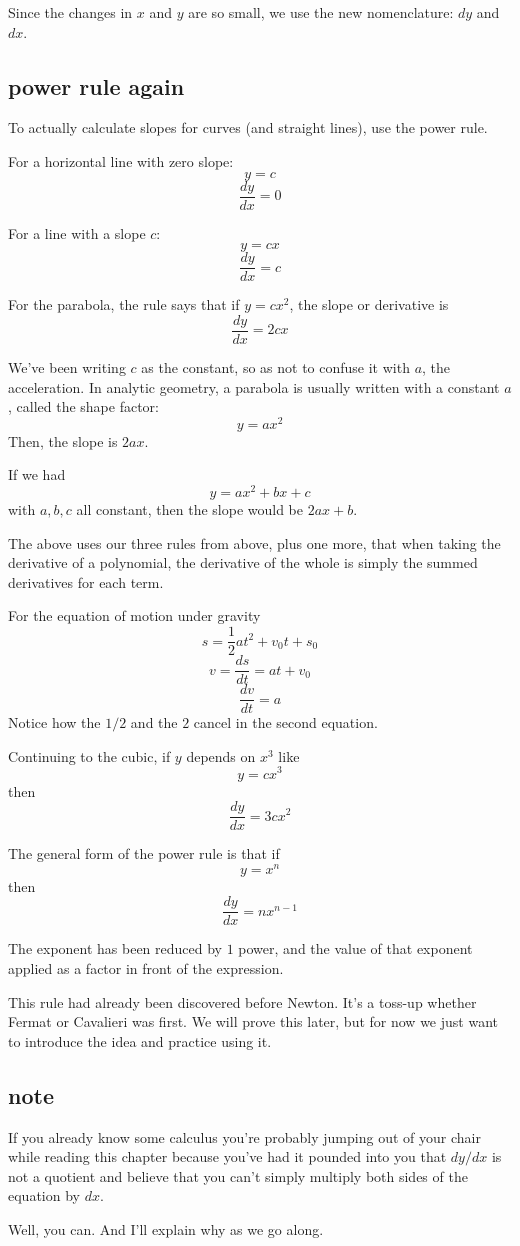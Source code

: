 \documentclass[11pt, oneside]{article}
\begin{document}
Since the changes in $x$ and $y$ are so small, we use the new nomenclature:  $dy$ and $dx$.

\subsection*{power rule again}
To actually calculate slopes for curves (and straight lines), use the power rule.

For a horizontal line with zero slope:
\[ y = c \]
\[ \frac{dy}{dx} = 0 \]

For a line with a slope $c$:
\[ y = cx \]
\[ \frac{dy}{dx} = c \]

For the parabola, the rule says that if $y = cx^2$, the slope or derivative is
\[ \frac{dy}{dx} = 2cx \]

We've been writing $c$ as the constant, so as not to confuse it with $a$, the acceleration.  In analytic geometry, a parabola is usually written with a constant $a$, called the shape factor:
\[ y = ax^2 \]
Then, the slope is $2ax$.  

If we had
\[ y = ax^2 + bx + c \]
with $a,b,c$ all constant, then the slope would be $2ax + b$.  

The above uses our three rules from above, plus one more, that when taking the derivative of a polynomial, the derivative of the whole is simply the summed derivatives for each term.

For the equation of motion under gravity
\[ s = \frac{1}{2} a t^2 + v_0 t + s_0 \]
\[ v = \frac{ds}{dt} = at + v_0 \]
\[ \frac{dv}{dt} = a \]
Notice how the $1/2$ and the $2$ cancel in the second equation.

Continuing to the cubic, if $y$ depends on $x^3$ like
\[ y = cx^3 \]
then
\[ \frac{dy}{dx} = 3cx^2 \]

The general form of the power rule is that if
\[ y = x^n \]
then
\[ \frac{dy}{dx} = n x^{n-1} \]

The exponent has been reduced by $1$ power, and the value of that exponent applied as a factor in front of the expression.

This rule had already been discovered before Newton.  It's a toss-up whether Fermat or Cavalieri was first.  We will prove this later, but for now we just want to introduce the idea and practice using it.

\subsection*{note}
If you already know some calculus you're probably jumping out of your chair while reading this chapter because you've had it pounded into you that $dy/dx$ is not a quotient and believe that you can't simply multiply both sides of the equation by $dx$.

Well, you can.  And I'll explain why as we go along.
\end{document}
